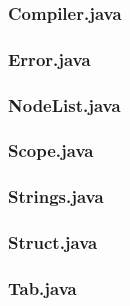 \subsubsection{Compiler.java}

\subsubsection{Error.java}

\subsubsection{NodeList.java}

\subsubsection{Scope.java}

\subsubsection{Strings.java}

\subsubsection{Struct.java}

\subsubsection{Tab.java}